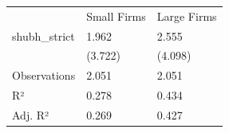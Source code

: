 \begin{tabular}{lll}
& Small Firms & Large Firms \\
shubh\_strict & \num{1.962} & \num{2.555} \\
& (\num{3.722}) & (\num{4.098}) \\
Observations & \num{2,051} & \num{2,051} \\
R² & \num{0.278} & \num{0.434} \\
Adj. R² & \num{0.269} & \num{0.427} \\
\end{tabular}
